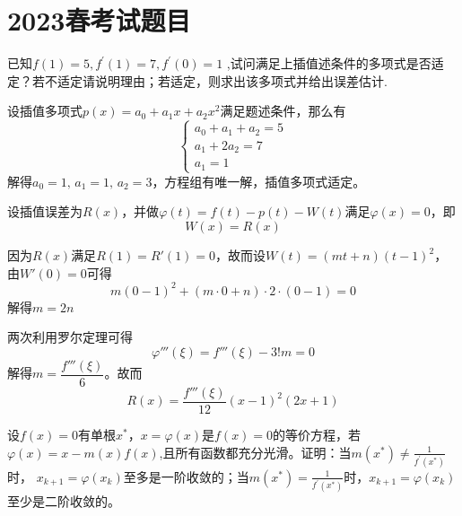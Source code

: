\section{2023春考试题目}
\begin{example}
    已知$f(1)=5,f^{\prime}(1)=7,f^{\prime}(0)=1$ ,试问满足上插值述条件的多项式是否适定？若不适定请说明理由；若适定，则求出该多项式并给出误差估计.
\end{example}
\begin{solution}
    设插值多项式$p(x) = a_0+a_1x+a_2x^2$满足题述条件，那么有
    \[
        \left\{
            \begin{array}{l}
                a_0+a_1+a_2 = 5\\
                a_1+2a_2 = 7\\
                a_1 = 1
            \end{array}
        \right.
    \]
    解得$a_0 = 1,\,a_1 = 1,\,a_2 = 3$，方程组有唯一解，插值多项式适定。
    
    设插值误差为$R(x)$，并做$\varphi(t) = f(t)-p(t)-W(t)$满足$\varphi(x) = 0$，即
    \[
        W(x) =  R(x) 
    \]
    
    因为$R(x)$满足$R(1) = R'(1) = 0$，故而设$W(t) = (mt+n)(t-1)^2$，由$W'(0) = 0$可得
    \[
        m(0-1)^2+(m\cdot 0+n)\cdot 2\cdot (0-1) = 0
    \]
    解得$m = 2n$

    两次利用罗尔定理可得
    \[
        \varphi'''(\xi) = f'''(\xi)- 3!m = 0
    \]
    解得$m = \dfrac{f'''(\xi)}{6}$。故而
    \[
        R(x) = \frac{f'''(\xi)}{12}(x-1)^2(2x+1)
    \]
\end{solution}
\begin{example}
    设$f(x)=0$有单根$x^*$，$x=\varphi(x)$是$f(x)=0$的等价方程，若$\varphi(x)=x-m(x)f(x)$,且所有函数都充分光滑。证明：当$m(x^*)\neq\frac1{f^{\prime}(x^*)}$时， $x_{k+1}=\varphi(x_k)$至多是一阶收敛的；当$m(x^*)=\frac1{f^{\prime}(x^*)}$时，$x_{k+1}=\varphi(x_k)$至少是二阶收敛的。
\end{example}
